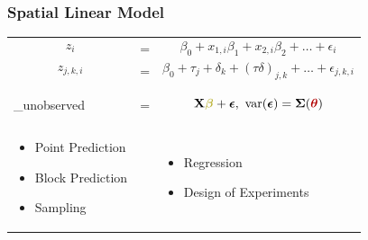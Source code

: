 \documentclass[mathserif,compress]{beamer}\usepackage{graphicx, color}
\def\bit{\begin{itemize}}
\def\eit{\end{itemize}}
\def\bz{\mathbf{z}}
\def\bX{\mathbf{X}}
\def\bbeta{\mbox{\boldmath $\beta$}}
\def\bepsilon{\mbox{\boldmath $\epsilon$}}
\def\btheta{\mbox{\boldmath $\theta$}}
\def\bSigma{\mbox{\boldmath $\Sigma$}}
\def\var{\textrm{var}}
\begin{document}
\begin{frame} 
\frametitle{Spatial Linear Model}
     
	\begin{tabular} {p{4.5cm} p{.5cm} p{4.5cm}}
		\vspace{-.2cm} \[ z_i \] & \vspace{.1cm}  = & \vspace{-.6cm}
			\[\beta_0 + x_{1,i}\beta_1 + x_{2,i}\beta_2 + \ldots + \epsilon_i \] \\
		\vspace{-.6cm} \[ z_{j,k,i} \] & \vspace{-.3cm} = &  \vspace{-1cm}
			\[\beta_0 + \tau_{j} + \delta_{k} + (\tau\delta)_{j,k} + 
			\ldots + \epsilon_{j,k,i} 	\] \\
		\vspace{-.6cm} \[
			\left(\begin{array}{c}	
					\bz_{\textrm{observed}} \\
					{\color{green!70!black} \bz_{\textrm{unobserved}}}
				\end{array} \right) 
		\] & \vspace{-.2cm} = & 
		\vspace{-.9cm} \[\bX{\color{yellow!70!black}\bbeta} + 
			\bepsilon, \ \var(\bepsilon) = \bSigma({\color{red!70!black}\btheta}) \] \\
		\bit
			\item{{\color{green!70!black}Point Prediction}} 
			\item{{\color{green!70!black}Block Prediction}} 
			\item{{\color{green!70!black}Sampling}} 
		\eit & &
		\bit
			\item{{\color{yellow!70!black}Regression}} 
			\item{{\color{yellow!70!black}Design of Experiments}}
		\eit
	\end{tabular}

\end{frame}

\end{document}

